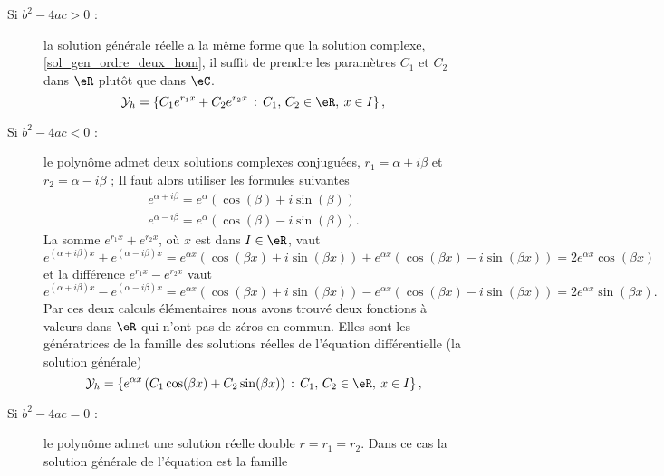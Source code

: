 \begin{description}
	\item[Si \( b^2 - 4ac >0\) :] la solution générale réelle a la m\^eme forme que la solution complexe, \eqref{sol_gen_ordre_deux_hom}, il suffit de prendre les paramètres \( C_1\) et \( C_2\) dans \( \eR\) plut\^ot que dans \( \eC\).
	      \begin{equation}\label{sol_gen_reelle_ordre_deux_hom}
		      \mathcal{Y}_h  = \left\{C_1 e^{r_1x} +C_2 e^{r_2x} \,:\, C_1,\, C_2 \in \eR, \: x\in I\right\},
	      \end{equation}
	\item[Si \( b^2 - 4ac <0\) :] le polynôme admet deux solutions complexes conjuguées, \( r_1 = \alpha + i \beta\) et \( r_2 = \alpha - i \beta\) ; Il faut alors utiliser les formules suivantes
	      \begin{equation}
		      \begin{array}{l}
			      e^{\alpha + i \beta} =e^{\alpha}(\cos(\beta) + i \sin(\beta)) \\
			      e^{\alpha - i \beta} =e^{\alpha}(\cos(\beta) - i \sin(\beta)).
		      \end{array}
	      \end{equation}
	      La somme \( e^{r_1x} +e^{r_2x}\), où \( x\) est dans \( I\in\eR\), vaut
	      \[
		      e^{(\alpha + i \beta)x} + e^{(\alpha - i \beta)x}=e^{\alpha x}(\cos(\beta x) + i \sin(\beta x )) + e^{\alpha x}(\cos(\beta x) - i \sin(\beta x)) =2 e^{\alpha x}\cos(\beta x)
	      \]
	      et la différence \( e^{r_1x} -e^{r_2x}\) vaut
	      \[
		      e^{(\alpha + i \beta)x} - e^{(\alpha - i \beta)x}=e^{\alpha x}(\cos(\beta x) + i \sin(\beta x )) - e^{\alpha x}(\cos(\beta x) - i \sin(\beta x)) =2 e^{\alpha x}\sin(\beta x).
	      \]
	      Par ces deux calculs élémentaires nous avons trouvé deux fonctions à valeurs dans \( \eR\) qui n'ont pas de zéros en commun. Elles sont les génératrices de la famille des solutions réelles de l'équation différentielle (la solution générale)
	      \begin{equation}\label{sol_gen_reelle_ordre_deux_hom_complconj}
		      \mathcal{Y}_h  = \left\{ e^{\alpha x}\left(C_1\cos(\beta x) +C_2\sin(\beta x)\right)  \,:\, C_1,\, C_2 \in \eR, \: x\in I\right\},
	      \end{equation}
	\item[Si \( b^2 - 4ac =0\) :] le polynôme admet une solution réelle double \( r=r_1 = r_2\). Dans ce cas la solution générale de l'équation est la famille
	      \begin{equation}\label{sol_gen_reelle_ordre_deux_hom_doublerac}

\end{equation}
\end{description}
